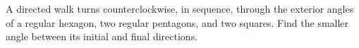 A directed walk turns counterclockwise, in sequence, through the exterior angles of a regular hexagon, two regular pentagons, and two squares. Find the smaller angle between its initial and final directions.
